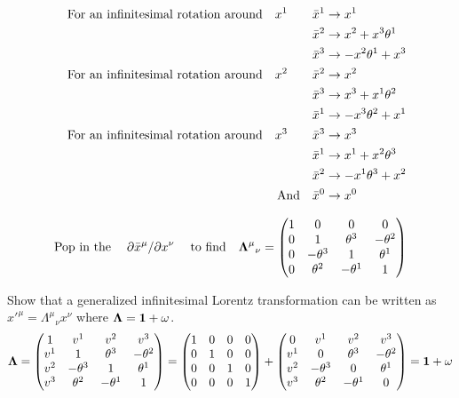 \documentclass{article}
\begin{document}
\begin{align*}
	\qq{For an infinitesimal rotation around}x^1\qquad \bar{x}^1 & \to x^1                \\
	\bar{x}^2                                                    & \to x^2 +x^3 \theta^1  \\
	\bar{x}^3                                                    & \to -x^2 \theta^1 +x^3 \\
	\qq{For an infinitesimal rotation around}x^2\qquad \bar{x}^2 & \to x^2                \\
	\bar{x}^3                                                    & \to x^3 +x^1 \theta^2  \\
	\bar{x}^1                                                    & \to -x^3 \theta^2 +x^1 \\
	\qq{For an infinitesimal rotation around}x^3\qquad \bar{x}^3 & \to x^3                \\
	\bar{x}^1                                                    & \to x^1 +x^2 \theta^3  \\
	\bar{x}^2                                                    & \to -x^1 \theta^3 +x^2 \\
	\qq{And} \bar{x}^0                                           & \to x^0                \\
\end{align*}

\[ \qq*{Pop in the}\pdv*{\bar{x}^\mu}{x^\nu}\qq{to find}{\vb{\Lambda}^\mu}_\nu=\begin{pmatrix}1 & 0 & 0 & 0 \\0&1&\theta^3&-\theta^2\\0&-\theta^3&1&\theta^1\\0&\theta^2&-\theta^1&1\\
	\end{pmatrix}\]

Show that a generalized infinitesimal Lorentz transformation can be written as $x'^\mu={\Lambda^\mu}_\nu x^\nu$ where $\vb{\Lambda}=\vb{1}+\vb{\omega}$.
\[ \vb{\Lambda}=\begin{pmatrix}1 & v^1 & v^2 & v^3 \\v^1&1&\theta^3&-\theta^2\\v^2&-\theta^3&1&\theta^1\\v^3&\theta^2&-\theta^1&1\\
	\end{pmatrix}=\begin{pmatrix}1 & 0 & 0 & 0 \\0&1&0&0\\0&0&1&0\\0&0&0&1\\
	\end{pmatrix}+\begin{pmatrix}0 & v^1 & v^2 & v^3 \\v^1&0&\theta^3&-\theta^2\\v^2&-\theta^3&0&\theta^1\\v^3&\theta^2&-\theta^1&0\\
	\end{pmatrix}=\vb{1}+\vb{\omega}
\]
\end{document}
